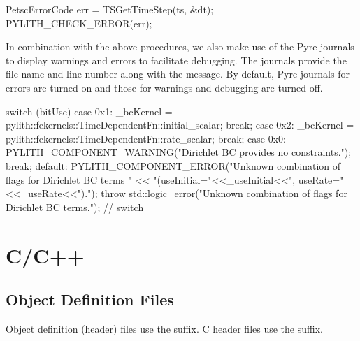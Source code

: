 \begin{cplusplus}
  PetscErrorCode err = TSGetTimeStep(ts, &dt); PYLITH_CHECK_ERROR(err);
\end{cplusplus}

In combination with the above procedures, we also make use of the Pyre
journals to display warnings and errors to facilitate debugging. The
journals provide the file name and line number along with the
message. By default, Pyre journals for errors are turned on and those
for warnings and debugging are turned off.

\begin{cplusplus}
    switch (bitUse) {
    case 0x1:
        _bcKernel = pylith::fekernels::TimeDependentFn::initial_scalar;
        break;
    case 0x2:
        _bcKernel = pylith::fekernels::TimeDependentFn::rate_scalar;
        break;
    case 0x0:
        PYLITH_COMPONENT_WARNING("Dirichlet BC provides no constraints.");
        break;
    default:
        PYLITH_COMPONENT_ERROR("Unknown combination of flags for Dirichlet BC terms "
            << "(useInitial="<<_useInitial<<", useRate="<<_useRate<<").");
        throw std::logic_error("Unknown combination of flags for Dirichlet BC terms.");
    } // switch
\end{cplusplus}



\section{C/C++}

\subsection{Object Definition Files}

Object definition (header) files use the  suffix. C
header files use the  suffix.


